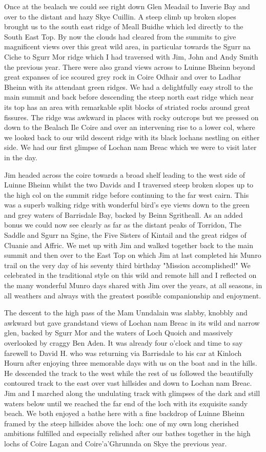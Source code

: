 \documentclass[a5paper,openany,font 10pt]{scrbook}
\begin{document}
Once at the bealach we could see right down Glen Meadail to
Inverie Bay and over to the distant and hazy Skye Cuillin. A
steep climb up broken slopes brought us to the south east ridge
of Meall Buidhe which led directly to the South East Top. By now
the clouds had cleared from the summits to give magnificent views
over this great wild area, in particular towards the Sgurr na
Ciche to Sgurr Mor ridge which I had traversed with Jim, John and
Andy Smith the previous year. There were also grand views across
to Luinne Bheinn beyond great expanses of ice scoured grey rock
in Coire Odhair and over to Ladhar Bheinn with its attendant
green ridges. We had a delightfully easy stroll to the main
summit and back before descending the steep north east ridge
which near its top has an area with remarkable split blocks of
striated rocks around great fissures. The ridge was awkward in
places with rocky outcrops but we pressed on down to the Bealach
Ile Coire and over an intervening rise to a lower col, where we
looked back to our wild descent ridge with its black lochans
nestling on either side. We had our first glimpse of Lochan nam
Breac which we were to visit later in the day.

Jim headed across the coire towards a broad shelf leading to
the west side of Luinne Bheinn whilst the two Davids and I
traversed steep broken slopes up to the high col on the summit
ridge before continuing to the far west cairn. This was a superb
walking ridge with wonderful bird's eye views down to the green
and grey waters of Barrisdale Bay, backed by Beinn Sgritheall. As
an added bonus we could now see clearly as far as the distant
peaks of Torridon, The Saddle and Sgurr na Sgine, the Five
Sisters of Kintail and the great ridges of Cluanie and Affric. We
met up with Jim and walked together back to the main summit and
then over to the East Top on which Jim at last completed his
Munro trail on the very day of his seventy third birthday
"Mission accomplished!" We celebrated in the traditional style on
this wild and remote hill and I reflected on the many wonderful
Munro days shared with Jim over the years, at all seasons, in all
weathers and always with the greatest possible companionship and
enjoyment.

The descent to the high pass of the Mam Unndalain was
slabby, knobbly and awkward but gave grandstand views of Lochan
nam Breac in its wild and narrow glen, backed by Sgurr Mor and
the waters of Loch Quoich and massively overlooked by craggy Ben
Aden. It was already four o'clock and time to say farewell to
David H. who was returning via Barrisdale to his car at Kinloch
Hourn after enjoying three memorable days with us on the boat and
in the hills. He descended the track to the west while the rest
of us followed the beautifully contoured track to the east over
vast hillsides and down to Lochan nam Breac. Jim and I marched
along the undulating track with glimpses of the dark and still
waters below until we reached the far end of the loch with its
exquisite sandy beach. We both enjoyed a bathe here with a fine
backdrop of Luinne Bheinn framed by the steep hillsides above the
loch: one of my own long cherished ambitions fulfilled and
especially relished after our bathes together in the high lochs
of Coire Lagan and Coire'a'Ghrunnda on Skye the previous year.
\end{document}
